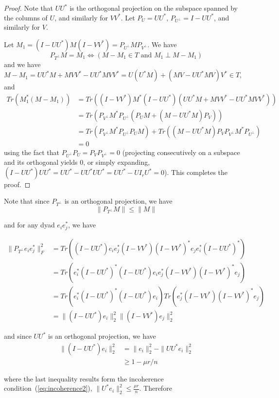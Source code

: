 \begin{proof}
Note that $UU^*$ is the orthogonal projection on the subspace spanned by the columns of $U$, and similarly for $VV^*$. Let $P_U = UU^*$, $P_{U^\perp} = I - UU^*$, and similarly for $V$.

Let $M_1 = (I - UU^*)M(I - VV^*) = P_{U^\perp} M P_{V^\perp}$. We have
\[
P_{T^\perp} M = M_1 \Leftrightarrow (M - M_1 \in T \text{ and } M_1 \perp M - M_1)
\]
and we have $M - M_1 = UU^*M + MVV^* - UU^*MVV^* = U(U^*M) + (MV - UU^*MV)V^* \in T$, and
\begin{align*}
Tr(M_1^* (M - M_1))
&= Tr((I-VV^*)M^*(I-UU^*)(UU^*M + MVV^* - UU^*MVV^*)) \\
&= Tr(P_{V^\perp}M^*P_{U^\perp}(P_UM + (M - UU^*M)P_V)) \\
&= Tr(P_{V^\perp}M^*P_{U^\perp}P_UM) + Tr((M - UU^*M)P_VP_{V^\perp}M^*P_{U^\perp})\\
&=0
\end{align*}
using the fact that $P_{U^\perp}P_U = P_V P_{V^\perp} = 0$ (projecting consecutively on a subspace and its orthogonal yields 0, or simply expanding, $(I-UU^*)UU^* = UU^* - UU^*UU^* = UU^* - U I_r U^* = 0$). This completes the proof.
\end{proof}

Note that since $P_{T^\perp}$ is an orthogonal projection, we have
\begin{equation}
\| P_{T^\perp} M \| \leq \|M\| \label{property: p2}
\end{equation}

and for any dyad $e_i e_j^*$, we have

\begin{align*}
\|P_{T^\perp} e_ie_j^*\|_F^2
&= Tr\left( (I-UU^*)e_ie_j^*(I-VV^*)(I-VV^*)^*e_je_i^*(I-UU^*)^* \right) \\
&= Tr\left( e_i^*(I-UU^*)^*(I-UU^*)e_ie_j^*(I-VV^*)(I-VV^*)^*e_j \right) \\
&= Tr\left( e_i^*(I-UU^*)^*(I-UU^*)e_i\right) Tr \left(e_j^*(I-VV^*)(I-VV^*)^*e_j \right) \\
&= \|(I - UU^*)e_i\|_2^2 \|(I - VV^*)e_j\|_2^2
\end{align*}

and since $UU^*$ is an orthogonal projection, we have
\begin{align*}
\|(I - UU^*)e_i\|_2^2
&= \|e_i\|_2^2 - \|UU^*e_i\|_2^2 \\
&\geq 1 - \mu r / n
\end{align*}

where the last inequality results form the incoherence condition~(\ref{eq:incoherence2}), $\|U^*e_i\|_2^2 \leq \frac{\mu r}{n}$. Therefore

